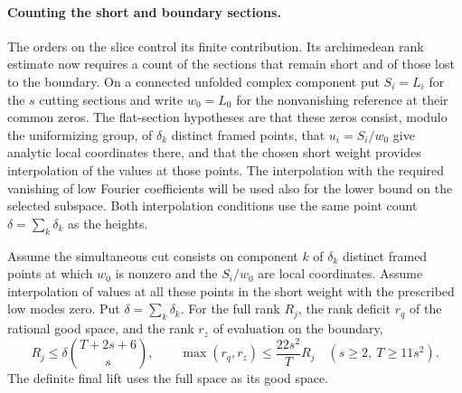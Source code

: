 \paragraph{Counting the short and boundary sections.}
The orders on the slice control its finite contribution. Its archimedean rank estimate now requires a count of the sections that remain short and of those lost to the boundary. On a connected unfolded complex component put
\(S_i=L_i\) for the \(s\) cutting sections and write
\(w_0=L_0\) for the nonvanishing reference at their
common zeros. The flat-section hypotheses are that these
zeros consist, modulo the uniformizing group, of
\(\delta_k\) distinct framed points, that
\(u_i=S_i/w_0\) give analytic local coordinates there, and
that the chosen short weight provides interpolation of the
values at those points. The interpolation with the required
vanishing of low Fourier coefficients will be used also for
the lower bound on the selected subspace. Both interpolation conditions use the same point count \(\delta=\sum_k\delta_k\) as the heights.

\begin{proposition}
\label{prop:slice-rank-shares}
Assume the simultaneous cut consists on component \(k\) of
\(\delta_k\) distinct framed points at which \(w_0\) is nonzero
and the \(S_i/w_0\) are local coordinates. Assume interpolation
of values at all these points in the short weight with the
prescribed low modes zero. Put \(\delta=\sum_k\delta_k\). For the full rank \(R_j\), the rank deficit \(r_q\) of the rational good space, and the rank \(r_z\) of evaluation on the boundary,
\[
 R_j\le\delta\binom{T+2s+6}{s},\qquad \max(r_q,r_z)\le\frac{22s^2}{T}R_j\quad(s\ge2,\ T\ge11s^2).
\]
 The definite final lift
uses the full space as its good space.
\end{proposition}

